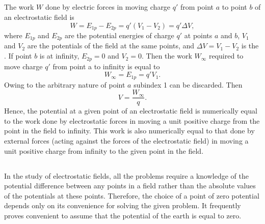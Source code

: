 \subsection{}\label{16.2.7} The work $W$ done by electric forces in moving charge $q'$ from point $a$ to point $b$ of an electrostatic field is
\begin{equation*}%
W = E_{1p} - E_{2p} = q'(V_{1} - V_{2}) = q' \Delta V,
\end{equation*}
where $E_{1p}$ and $E_{2p}$ are the potential energies of charge $q'$ at points $a$ and $b$, $V_{1}$ and $V_{2}$ are the potentials of the field at the same points, and $\Delta V = V_{1} - V_{2}$ is the . If point $b$ is at infinity, $E_{2p} = 0$ and $V_{2} = 0$. Then the work $W_{\infty}$ required to move charge $q'$ from point a to infinity is equal to
\begin{equation*}%
W_{\infty} = E_{1p} = q' V_{1}.
\end{equation*}
Owing to the arbitrary nature of point $a$ subindex 1 can be discarded. Then
\begin{equation*}%
V = \frac{W_{\infty}}{q}.
\end{equation*}
Hence, the potential at a given point of an electrostatic field is numerically equal to the work done by electrostatic forces in moving a unit positive charge from the point in the field to infinity. This work is also numerically equal to that done by external forces (acting against the forces of the electrostatic field) in moving a unit positive charge from infinity to the given point in the field.

\subsection{}\label{16.2.8} In the study of electrostatic fields, all the problems require a knowledge of the potential difference between any points in a field rather than the absolute values of the potentials at these points. Therefore, the choice of a point of zero potential depends only on its convenience for solving the given problem. It frequently proves convenient to assume that the potential of the earth is equal to zero.


